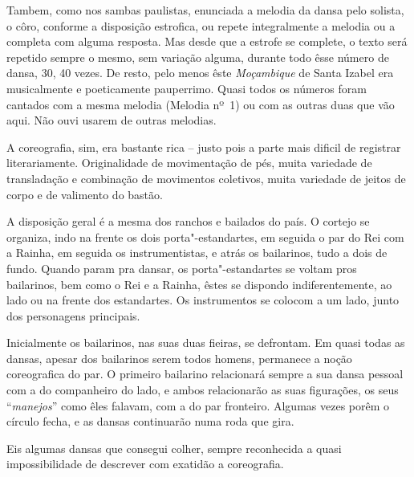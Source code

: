 Tambem, como nos sambas paulistas, enunciada a melodia da dansa pelo
solista, o côro, conforme a disposição estrofica, ou repete
integralmente a melodia ou a completa com alguma resposta. Mas desde que
a estrofe se complete, o texto será repetido sempre o mesmo, sem
variação alguma, durante todo êsse número de dansa, 30, 40 vezes. De
resto, pelo menos êste \emph{Moçambique} de Santa Izabel era
musicalmente e poeticamente pauperrimo. Quasi todos os números foram
cantados com a mesma melodia (Melodia nº~1) ou com as outras duas que vão
aqui. Não ouvi usarem de outras melodias.

A coreografia, sim, era bastante rica -- justo pois a parte mais dificil
de registrar literariamente. Originalidade de movimentação de pés, muita
variedade de transladação e combinação de movimentos coletivos, muita
variedade de jeitos de corpo e de valimento do bastão.

A disposição geral é a mesma dos ranchos e bailados do país. O cortejo
se organiza, indo na frente os dois porta"-estandartes, em seguida o par
do Rei com a Rainha, em seguida os instrumentistas, e atrás os
bailarinos, tudo a dois de fundo. Quando param pra dansar, os
porta"-estandartes se voltam pros bailarinos, bem como o Rei e a Rainha,
êstes se dispondo indiferentemente, ao lado ou na frente dos
estandartes. Os instrumentos se colocom a um lado, junto dos personagens
principais.

Inicialmente os bailarinos, nas suas duas fieiras, se defrontam. Em
quasi todas as dansas, apesar dos bailarinos serem todos homens,
permanece a noção coreografica do par. O primeiro bailarino relacionará
sempre a sua dansa pessoal com a do companheiro do lado, e ambos
relacionarão as suas figurações, os seus ``\emph{manejos}'' como êles
falavam, com a do par fronteiro. Algumas vezes porêm o círculo fecha, e
as dansas continuarão numa roda que gira.

Eis algumas dansas que consegui colher, sempre reconhecida a quasi
impossibilidade de descrever com exatidão a coreografia.


